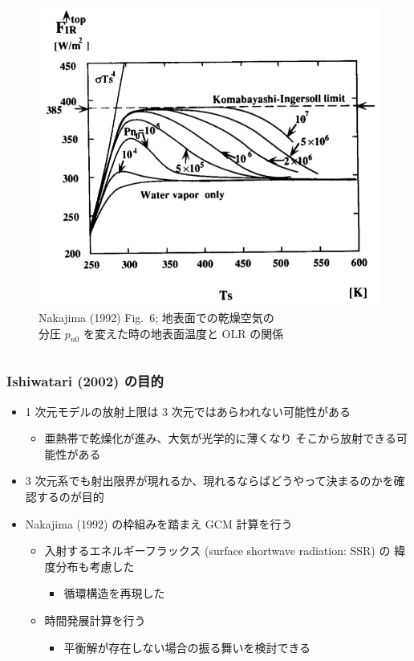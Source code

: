 \documentclass[aspectratio=149,9pt,fleqn]{beamer}
\begin{document}
\begin{frame}
\begin{columns}[T,onlytextwidth]
\begin{column}{.38\textwidth}
\begin{figure}
				\includegraphics[width=\textwidth]{nf6.png}\\
				Nakajima \etal (1992) Fig.\ 6; 地表面での乾燥空気の\\
				分圧 \(p_{n0}\) を変えた時の地表面温度と OLR の関係
			\end{figure}
		\end{column}
	\end{columns}
\end{frame}

\begin{frame}
	\frametitle{Ishiwatari \etal (2002) の目的}
	\begin{itemize}
		\item 1 次元モデルの放射上限は 3 次元ではあらわれない可能性がある
			\begin{itemize}
				\item 亜熱帯で乾燥化が進み、大気が光学的に薄くなり
					そこから放射できる可能性がある
			\end{itemize}
		\item 3 次元系でも射出限界が現れるか、現れるならばどうやって決まるのかを確認するのが目的
		\item Nakajima \etal (1992) の枠組みを踏まえ GCM 計算を行う
			\begin{itemize}
				\item 入射するエネルギーフラックス (surface shortwave radiation: SSR) の
					緯度分布も考慮した
					\begin{itemize}
						\item 循環構造を再現した
					\end{itemize}
				\item 時間発展計算を行う
					\begin{itemize}
						\item 平衡解が存在しない場合の振る舞いを検討できる
					\end{itemize}
			\end{itemize}
	\end{itemize}
\end{frame}
\end{document}
